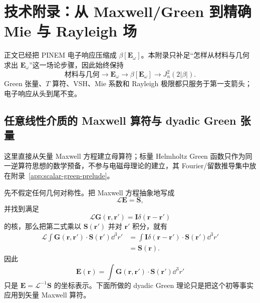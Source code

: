 \chapter{技术附录：从 Maxwell/Green 到精确 Mie 与 Rayleigh 场}
\label{chap:maxwell-general}
\label{chap:maxwell-applications}

正文已经把 PINEM 电子响应压缩成 \(\beta[\bm E_\omega]\)。本附录只补足“怎样从材料与几何求出 \(\bm E_\omega\)”这一场论步骤，因此始终保持
\begin{equation}
\boxed{
\text{材料与几何}
\longrightarrow
\bm E_\omega
\longrightarrow
\beta[\bm E_\omega]
\longrightarrow
J_n^2(2|\beta|).}
\label{eq:maxwell-to-pinem-chain}
\end{equation}
Green 张量、\(T\) 算符、VSH、Mie 系数和 Rayleigh 极限都只服务于第一支箭头；电子响应从头到尾不变。

\section{任意线性介质的 Maxwell 算符与 dyadic Green 张量}

这里直接从矢量 Maxwell 方程建立母算符；标量 Helmholtz Green 函数只作为同一逆算符思想的数学预备，不参与电磁母理论的建立，其 Fourier/留数推导集中放在附录~\ref{app:scalar-green-prelude}。


先不假定任何几何对称性。把 Maxwell 方程抽象地写成
\begin{equation}
\mathcal L\bm E=\bm S,
\end{equation}
并找到满足
\begin{equation}
\mathcal L\mathbf G(\bm r,\bm r')=\mathbf I\delta(\bm r-\bm r')
\end{equation}
的核，那么把第二式乘以 $\bm S(\bm r')$ 并对 $\bm r'$ 积分，就有
\begin{align}
\mathcal L\int\mathbf G(\bm r,\bm r')\cdot\bm S(\bm r')\dd^3r'
&=\int\mathbf I\delta(\bm r-\bm r')\cdot\bm S(\bm r')\dd^3r'\\
&=\bm S(\bm r).
\end{align}
因此
\begin{equation}
\bm E(\bm r)=\int\mathbf G(\bm r,\bm r')\cdot\bm S(\bm r')\dd^3r'
\end{equation}
只是 $\bm E=\mathcal L^{-1}\bm S$ 的坐标表示。下面所做的 dyadic Green 理论只是把这个初等事实应用到矢量 Maxwell 算符。

